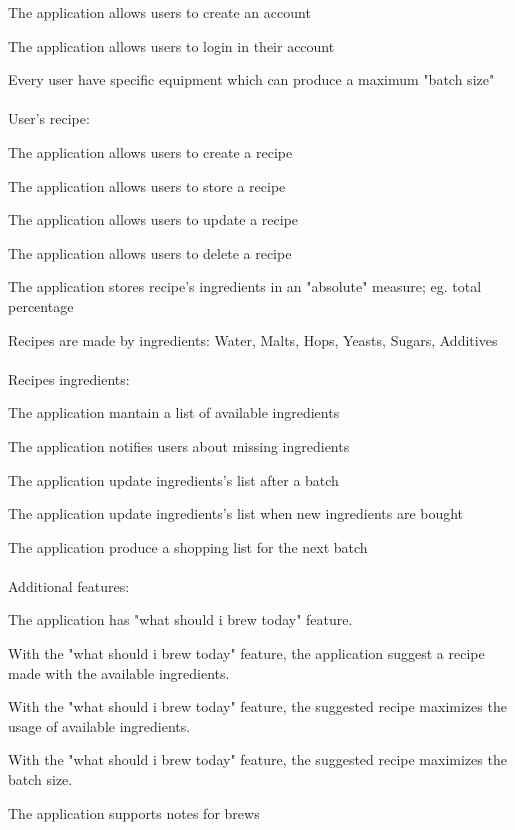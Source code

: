 \documentclass[12pt]{article}
\begin{document}
The application allows users to create an account

The application allows users to login in their account

	Every user have specific equipment which can produce a maximum "batch size"
\\
\\
User's recipe:
	
The application allows users to create a recipe

The application allows users to store a recipe 

The application allows users to update a recipe

The application allows users to delete a recipe

The application stores recipe's ingredients in an "absolute" measure; eg. total percentage

	Recipes are made by ingredients: Water, Malts, Hops, Yeasts, Sugars, Additives
\\
\\
Recipes ingredients:

The application mantain a list of available ingredients

The application notifies users about missing ingredients

The application update ingredients's list after a batch

The application update ingredients's list when new ingredients are bought

The application produce a shopping list for the next batch 
\\
\\
Additional features:

The application has "what should i brew today" feature.

	With the "what should i brew today" feature, the application suggest a recipe made with the available ingredients.

	With the "what should i brew today" feature, the suggested recipe maximizes the usage of available ingredients.

	With the "what should i brew today" feature, the suggested recipe maximizes the batch size.
	
The application supports notes for brews
\end{document}
